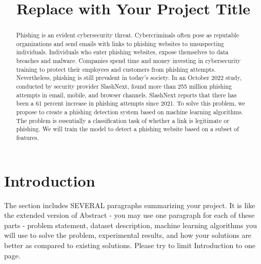 \documentclass[conference]{IEEEtran}
\begin{document}
\title{Replace with Your Project Title}

\author{
\and
{}
\and
{}
}

\maketitle


\begin{abstract}
Phishing is an evident cybersecurity threat. Cybercriminals often pose as reputable organizations and send emails with links to phishing websites to unsuspecting individuals. Individuals who enter phishing websites, expose themselves to data breaches and malware. Companies spend time and money investing in cybersecurity training to protect their employees and customers from phishing attempts. Nevertheless, phishing is still prevalent in today’s society. In an October 2022 study, conducted by security provider SlashNext, found more than 255 million phishing attempts in email, mobile, and browser channels. SlashNext reports that there has been a 61 percent increase in phishing attempts since 2021. To solve this problem, we propose to create a phishing detection system based on machine learning algorithms. The problem is essentially a classification task of whether a link is legitimate or phishing. We will train the model to detect a phishing website based on a subset of features. 
\end{abstract}

\section{Introduction}
The section includes SEVERAL paragraphs summarizing your project. It is like the extended version of Abstract - you may use one paragraph for each of these parts - problem statement, dataset description, machine learning algorithms you will use to solve the problem, experimental results, and how your solutions are better as compared to existing solutions. Please try to limit Introduction to one page.
\end{document}
